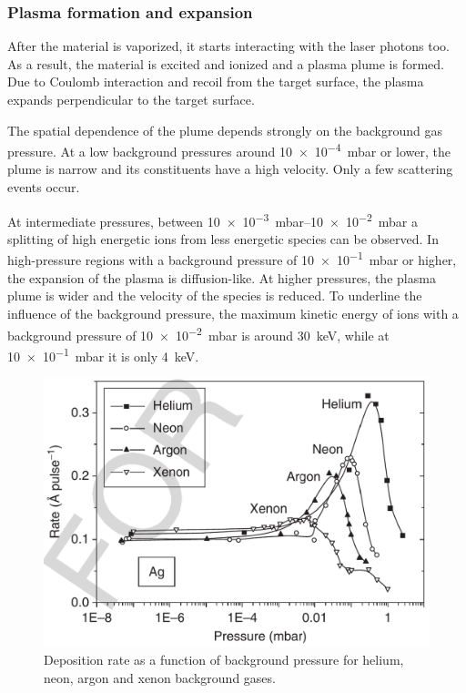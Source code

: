 \subsubsection{Plasma formation and expansion}
After the material is vaporized, it starts interacting with the laser photons too.
As a result, the material is excited and ionized and a plasma plume is formed.
Due to Coulomb interaction and recoil from the target surface, 
the plasma expands perpendicular to the target surface.

The spatial dependence of the plume depends strongly on the background gas pressure.
At a low background pressures around \qty{10e-4}{\milli \bar} or lower, the plume is
narrow and its constituents have a high velocity.
Only a few scattering events occur.

At intermediate pressures, between \qtyrange{10e-3}{10e-2}{\milli \bar}
a splitting of high energetic ions from less energetic species can be observed.
In high-pressure regions with a background pressure of \qty{10e-1}{\milli \bar} or 
higher, the expansion of the plasma is diffusion-like.
At higher pressures, the plasma plume is wider and the velocity of the species is
reduced.
To underline the influence of the background pressure, the maximum kinetic 
energy of ions with a background pressure of \qty{10e-2}{\milli \bar} is around
\qty{30}{\kilo \electronvolt}, while at \qty{10e-1}{\milli \bar} it is only
\qty{4}{\kilo \electronvolt}.
\begin{figure}
	\centering
	\includegraphics[width=0.98\columnwidth]{../assets/deposition_rate.png}
	\caption{Deposition rate as a function of background pressure for helium, neon, 
	argon and xenon background gases.}
	\label{fig:pld_plasma}
\end{figure}
